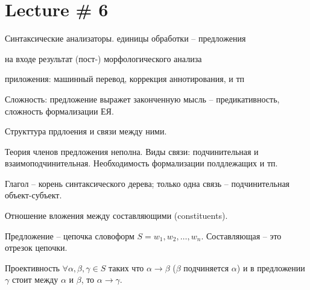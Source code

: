\documentclass[a4paper]{article}
\newcommand{\eng}[1]{\foreignlanguage{english}{#1}}
\begin{document}
\section{Lecture \# 6} %
\label{sec:lecture_6}

Синтаксические анализаторы. единицы обработки -- предложения

на входе результат (пост-) морфологического анализа

приложения: машинный перевод, коррекция аннотирования, и тп

Сложность: предложение выражет законченную мысль -- предикативность, сложность формализации ЕЯ.

Структтура прдлоения и связи между ними.

Теория членов предложения неполна.
Виды связи: подчинительная и взаимоподчинительная. Необходимость формализации полдлежащих и тп.

Глагол -- корень синтаксического дерева; только одна связь -- подчинительная объект-субъект.

Отношение вложения между составляющими (\eng{constituents}).

Предложение -- цепочка словоформ $S = w_1, w_2, \ldots, w_n$. Составляющая -- это отрезок цепочки.

Проективность $\forall \alpha, \beta, \gamma \in S$ таких что $\alpha\to \beta$ ($\beta$ подчиняется $\alpha$) и в предложении $\gamma$ стоит между $\alpha$ и $\beta$, то $\alpha\to\gamma$.







\end{document}
